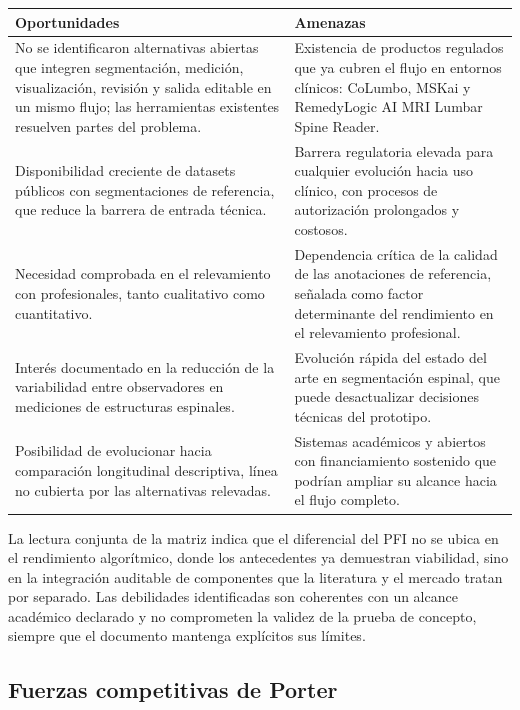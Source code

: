 \begin{longtable}{|>{\raggedright\arraybackslash}p{}|>{\raggedright\arraybackslash}p{}|}
\hline
\textbf{Oportunidades} & \textbf{Amenazas} \\
\hline
No se identificaron alternativas abiertas que integren segmentación, medición, visualización, revisión y salida editable en un mismo flujo; las herramientas existentes resuelven partes del problema. & Existencia de productos regulados que ya cubren el flujo en entornos clínicos: CoLumbo, MSKai y RemedyLogic AI MRI Lumbar Spine Reader. \\
\hline
Disponibilidad creciente de datasets públicos con segmentaciones de referencia, que reduce la barrera de entrada técnica. & Barrera regulatoria elevada para cualquier evolución hacia uso clínico, con procesos de autorización prolongados y costosos. \\
\hline
Necesidad comprobada en el relevamiento con profesionales, tanto cualitativo como cuantitativo. & Dependencia crítica de la calidad de las anotaciones de referencia, señalada como factor determinante del rendimiento en el relevamiento profesional. \\
\hline
Interés documentado en la reducción de la variabilidad entre observadores en mediciones de estructuras espinales. & Evolución rápida del estado del arte en segmentación espinal, que puede desactualizar decisiones técnicas del prototipo. \\
\hline
Posibilidad de evolucionar hacia comparación longitudinal descriptiva, línea no cubierta por las alternativas relevadas. & Sistemas académicos y abiertos con financiamiento sostenido que podrían ampliar su alcance hacia el flujo completo. \\
\hline
\end{longtable}
\endgroup

La lectura conjunta de la matriz indica que el diferencial del PFI no se ubica en el rendimiento algorítmico, donde los antecedentes ya demuestran viabilidad, sino en la integración auditable de componentes que la literatura y el mercado tratan por separado. Las debilidades identificadas son coherentes con un alcance académico declarado y no comprometen la validez de la prueba de concepto, siempre que el documento mantenga explícitos sus límites.

\subsection{Fuerzas competitivas de Porter}

